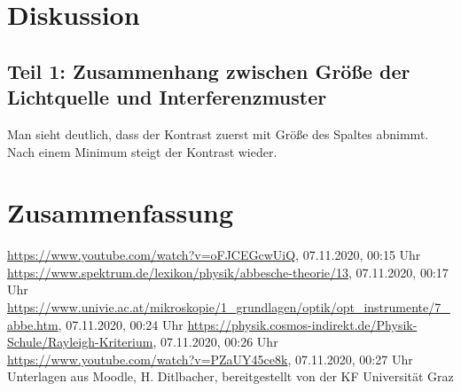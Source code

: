 \documentclass{article}
\begin{document}
\section{Diskussion}

\subsection{Teil 1: Zusammenhang zwischen Größe der Lichtquelle und Interferenzmuster}


Man sieht deutlich, dass der Kontrast zuerst mit Größe des Spaltes abnimmt. Nach einem Minimum steigt der Kontrast wieder.




\section{Zusammenfassung}








%

%


%


\begin{thebibliography}{9}
 \url{https://www.youtube.com/watch?v=oFJCEGcwUiQ}, 07.11.2020, 00:15 Uhr
 \url{https://www.spektrum.de/lexikon/physik/abbesche-theorie/13}, 07.11.2020, 00:17 Uhr
 \url{https://www.univie.ac.at/mikroskopie/1_grundlagen/optik/opt_instrumente/7_abbe.htm}, 07.11.2020, 00:24 Uhr
 \url{https://physik.cosmos-indirekt.de/Physik-Schule/Rayleigh-Kriterium}, 07.11.2020, 00:26 Uhr
 \url{https://www.youtube.com/watch?v=PZaUY45ce8k}, 07.11.2020, 00:27 Uhr
 Unterlagen aus Moodle, H. Ditlbacher, bereitgestellt von der KF Universität Graz
\end{thebibliography}
\end{document}

